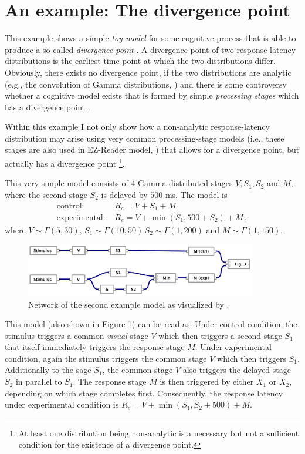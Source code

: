 \section{An example: The divergence point}
This example shows a simple \emph{toy model} for some cognitive process that is able to produce a
so called \emph{divergence point} \cite[e.g.,][]{Reingold2012}. A divergence point of two response-latency
distributions is the earliest time point at which the two distributions differ. Obviously, 
there exists no divergence point, if the two distributions are analytic 
(e.g., the convolution of Gamma distributions, \cite{Gelooven1999}) and there is some controversy
whether a cognitive model exists that is formed by simple \emph{processing stages} which has a
divergence point \cite[e.g.,][]{Gomez2016}.

Within this example I not only show how a non-analytic response-latency distribution may arise
using very common processing-stage models (i.e., these stages are also used in EZ-Reader model,
\cite{Reichle2003}) that allows for a divergence point, but actually has a divergence point%
\footnote{At least one distribution being non-analytic is a necessary but not a sufficient
condition for the existence of a divergence point.}. 

This very simple model consists of 4 Gamma-distributed stages $V, S_1, S_2$ and $M$,
where the second stage $S_2$ is delayed by $500$ ms. 
The model is
\begin{align}
 \text{control: } & R_c = V + S_1 + M \\
 \text{experimental: } & R_e = V + \min(S_1, 500+S_2) + M\,,
\end{align}
where $V \sim \Gamma(5,30),\,S_1\sim\Gamma(10,50)\,S_2\sim\Gamma(1,200)$ and $M\sim\Gamma(1,150)$.
\begin{figure}[!ht]
 \centering
 \includegraphics[width=0.9\textwidth]{fig/example2.pdf}
 \caption{Network of the second example model as visualized by .} \label{fig:example2}
\end{figure}

This model (also shown in Figure \ref{fig:example2}) can be read as: Under control condition, the stimulus triggers a common \emph{visual} 
stage $V$ which then triggers a second stage $S_1$ that itself immediately triggers the response stage $M$. Under experimental condition,
again the stimulus triggers the common stage $V$ which then triggers $S_1$. Additionally to the sage $S_1$, the common
stage $V$ also triggers the delayed stage $S_2$ in parallel to $S_1$. The response stage $M$ is then triggered by 
either $X_1$ or $X_2$, depending on which stage completes first. Consequently, the response latency
under experimental condition is $R_e = V + \min(S_1,S_2+500) + M$.

